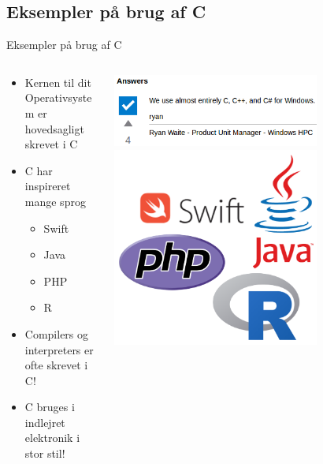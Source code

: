 \documentclass{beamer}
\begin{document}
\subsection{Eksempler på brug af C}
\begin{frame}{Eksempler på brug af C}
	\begin{columns}
	
	\begin{column}{0.5\textwidth}
	\begin{itemize}
	\item{Kernen til dit Operativsystem er hovedsagligt skrevet i C}
	\item{C har inspireret mange sprog}
		\begin{itemize}
		\item{Swift}
		\item{Java}
		\item{PHP}
		\item{R}
		\end{itemize}
	\item{Compilers og interpreters er ofte skrevet i C!}
	\item{C bruges i indlejret elektronik i stor stil!}
	\end{itemize}
	\end{column}
	
	\begin{column}{0.5\textwidth}
	\begin{center}
		\includegraphics[width=0.7\textwidth]{assets/windows-kernel.png}
		\break
		\includegraphics[width=0.7\textwidth]{assets/C-derivatives.png}
	\end{center}
	\end{column}
	
	\end{columns}
\end{frame}
\end{document}
